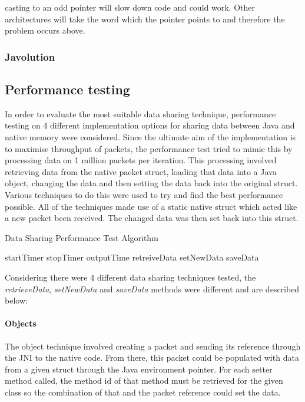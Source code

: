 \documentclass[final_report.tex]{subfiles}
\begin{document}
casting to an odd pointer will slow down code and could work. Other architectures will take the word which the pointer points to and therefore the problem occurs above.

\subsubsection{Javolution}


\subsection{Performance testing}
In order to evaluate the most suitable data sharing technique, performance testing on 4 different implementation options for sharing data between Java and native memory were considered. Since the ultimate aim of the implementation is to maximise throughput of packets, the performance test tried to mimic this by processing data on 1 million packets per iteration. This processing involved retrieving data from the native packet struct, loading that data into a Java object, changing the data and then setting the data back into the original struct. Various techniques to do this were used to try and find the best performance possible. All of the techniques made use of a static native struct which acted like a new packet been received. The changed data was then set back into this struct.

\begin{algorithm}[H]
	\caption{Data Sharing Performance Test Algorithm}
	\label{alg:data}
	\begin{algorithmic}[1]
				\State startTimer
				\State {}
				\State stopTimer
				\State outputTime				
			\EndFor
		\EndFunction
		\newline
				\State retreiveData
				\State setNewData
				\State saveData
			\EndFor
		\EndFunction
	\end{algorithmic}
\end{algorithm}

Considering there were 4 different data sharing techniques tested, the \textit{retrieveData}, \textit{setNewData} and \textit{saveData} methods were different and are described below:

\paragraph*{Objects}
The object technique involved creating a packet and sending its reference through the JNI to the native code. From there, this packet could be populated with data from a given struct through the Java environment pointer. For each setter method called, the method id of that method must be retrieved for the given class so the combination of that and the packet reference could set the data.
\end{document}
